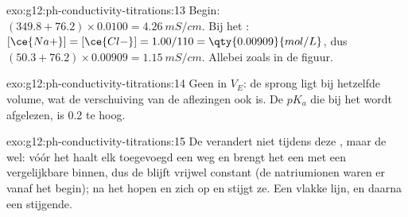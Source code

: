 \begin{solution}{exo:g12:ph-conductivity-titrations:13}
Begin: $(349.8 + 76.2) \times 0.0100 = \qty{4.26}{mS/cm}$. Bij het
: $[\ce{Na+}] = [\ce{Cl-}] = 1.00/110 = \qty{0.00909}{mol/L}$,
dus $(50.3 + 76.2) \times 0.00909 = \qty{1.15}{mS/cm}$. Allebei zoals in
de figuur.
\end{solution}

\begin{solution}{exo:g12:ph-conductivity-titrations:14}
Geen in $V_E$: de sprong ligt bij hetzelfde volume, wat de verschuiving
van de aflezingen ook is. De $pK_a$ die bij het  wordt
afgelezen, is 0.2 te hoog.
\end{solution}

\begin{solution}{exo:g12:ph-conductivity-titrations:15}
De  verandert niet tijdens deze , maar de  wel:
vóór het  haalt elk toegevoegd  een  weg
en brengt het een
 met een vergelijkbare  binnen, dus de
 blijft vrijwel constant (de natriumionen waren er vanaf
het begin); na het  hopen  en 
zich op en stijgt ze. Een vlakke lijn, en daarna een stijgende.
\end{solution}

